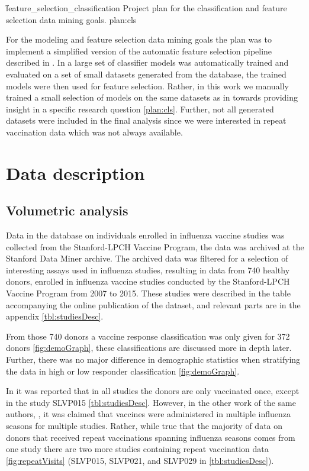 \f{feature_selection_classification}
{Project plan for the classification and feature selection data mining goals.}
{plan:cls}

For the modeling and feature selection data mining goals the plan was to implement a simplified version of the automatic feature selection pipeline described in \spaper.
In \spaper a large set of classifier models was automatically trained and evaluated on a set of small datasets generated from the \flup database, the trained models were then used for feature selection.
Rather, in this work we manually trained a small selection of models on the same datasets as in \spaper towards providing insight in a specific research question \autoref{plan:cls}.
Further, not all generated datasets were included in the final analysis since we were interested in repeat vaccination data which was not always available.



\section{Data description}

\subsection{Volumetric analysis}

Data in the \flup database on individuals enrolled in influenza vaccine studies was collected from the Stanford-LPCH Vaccine Program, the data was archived at the Stanford Data Miner archive.
The archived data was filtered for a selection of interesting assays used in influenza studies, resulting in data from 740 healthy donors, enrolled in influenza vaccine studies conducted by the Stanford-LPCH Vaccine Program from 2007 to 2015.
These studies were described in the table accompanying the online publication of the \flup dataset, and relevant parts are in the appendix \autoref{tbl:studiesDesc}.

From those 740 donors a vaccine response classification was only given for 372 donors \autoref{fig:demoGraph}, these classifications are discussed more in depth later.
Further, there was no major difference in demographic statistics when stratifying the data in high or low responder classification \autoref{fig:demoGraph}.

In \dpaper it was reported that in all studies the donors are only vaccinated once, except in the study SLVP015 \autoref{tbl:studiesDesc}.
However, in the other work of the same authors, \spaper, it was claimed that vaccines were administered in multiple influenza seasons for multiple studies.
Rather, while true that the majority of data on donors that received repeat vaccinations spanning influenza seasons comes from one study there are two more studies containing repeat vaccination data \autoref{fig:repeatVisits} (SLVP015, SLVP021, and SLVP029 in \autoref{tbl:studiesDesc}).

